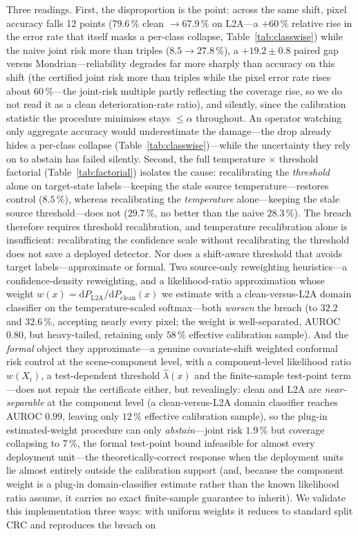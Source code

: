 \documentclass[preprint,3p,times]{elsarticle}
\begin{document}
Three readings. First, the disproportion is the point: across the same shift, pixel accuracy falls 12 points ($79.6\,\%$ clean $\to 67.9\,\%$ on L2A---a $+60\,\%$ relative rise in the error rate that itself masks a per-class collapse, Table~\ref{tab:classwise}) while the naive joint risk more than triples ($8.5 \to 27.8\,\%$), a $+19.2 \pm 0.8$ paired gap versus Mondrian---reliability degrades far more sharply than accuracy on this shift (the certified joint risk more than triples while the pixel error rate rises about $60\,\%$---the joint-risk multiple partly reflecting the coverage rise, so we do not read it as a clean deterioration-rate ratio), and silently, since the calibration statistic the procedure minimises stays $\leq \alpha$ throughout. An operator watching only aggregate accuracy would underestimate the damage---the drop already hides a per-class collapse (Table~\ref{tab:classwise})---while the uncertainty they rely on to abstain has failed silently. Second, the full temperature $\times$ threshold factorial (Table~\ref{tab:factorial}) isolates the cause: recalibrating the \emph{threshold} alone on target-state labels---keeping the stale source temperature---restores control ($8.5\,\%$), whereas recalibrating the \emph{temperature} alone---keeping the stale source threshold---does not ($29.7\,\%$, no better than the naive $28.3\,\%$). The breach therefore requires threshold recalibration, and temperature recalibration alone is insufficient: recalibrating the confidence scale without recalibrating the threshold does not save a deployed detector. Nor does a shift-aware threshold that avoids target labels---approximate or formal. Two source-only reweighting heuristics---a confidence-density reweighting, and a likelihood-ratio approximation whose weight $w(x)=\mathrm{d}P_{\mathrm{L2A}}/\mathrm{d}P_{\mathrm{clean}}(x)$ we estimate with a clean-versus-L2A domain classifier on the temperature-scaled softmax---both \emph{worsen} the breach (to $32.2$ and $32.6\,\%$, accepting nearly every pixel; the weight is well-separated, AUROC $0.80$, but heavy-tailed, retaining only $58\,\%$ effective calibration sample). And the \emph{formal} object they approximate---a genuine covariate-shift weighted conformal risk control at the scene-component level, with a component-level likelihood ratio $w(X_i)$, a test-dependent threshold $\hat\lambda(x)$ and the finite-sample test-point term \citep{tibshirani2019,angelopoulos2024}---does not repair the certificate either, but revealingly: clean and L2A are \emph{near-separable} at the component level (a clean-versus-L2A domain classifier reaches AUROC $0.99$, leaving only $12\,\%$ effective calibration sample), so the plug-in estimated-weight procedure can only \emph{abstain}---joint risk $1.9\,\%$ but coverage collapsing to $7\,\%$, the formal test-point bound infeasible for almost every deployment unit---the theoretically-correct response when the deployment units lie almost entirely outside the calibration support (and, because the component weight is a plug-in domain-classifier estimate rather than the known likelihood ratio \citet{tibshirani2019} assume, it carries no exact finite-sample guarantee to inherit). We validate this implementation three ways: with uniform weights it reduces to standard split CRC and reproduces the breach on 
\end{document}
